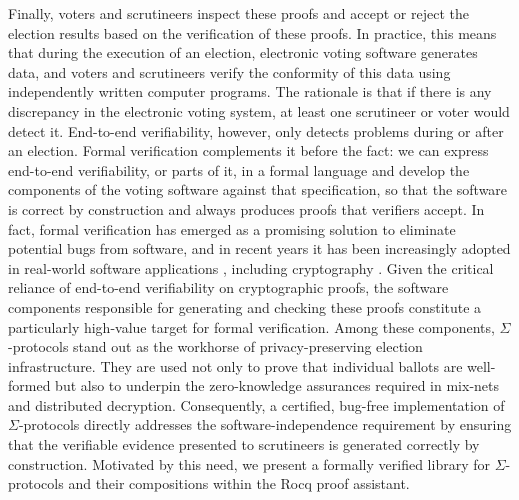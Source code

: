 \documentclass[sigconf,anonymous,review]{acmart}
\begin{document}
Finally, voters and scrutineers inspect these proofs and accept or reject the election results based on 
the verification of these proofs. In practice, this means that during the execution of an election, 
electronic voting software generates data, and voters and scrutineers verify the conformity of 
this data using independently written computer programs. The rationale is that if there is 
any discrepancy in the electronic voting system, at least one scrutineer or voter would detect it.
End-to-end verifiability, however, only detects problems during or after an election. Formal 
verification complements it before the fact: we can express end-to-end verifiability, or parts of it, 
in a formal language and develop the components of the voting software against that specification, 
so that the software is correct by construction and always produces proofs that verifiers accept.
In fact, formal verification has emerged as a promising solution 
to eliminate potential bugs from software, and in recent years it has been increasingly 
adopted in real-world software applications \cite{10.1145/1111037.1111042}, 
including cryptography \cite{8835346,10.1145/3133956.3134043,190894,10.1145/2701415,
10.1145/2660267.2660370,10.1145/3319535.3363211}. Given the critical reliance of end-to-end verifiability on cryptographic proofs, the software components responsible for generating and checking these proofs constitute a particularly high-value target for formal verification. Among these components, $\Sigma$-protocols stand out as the workhorse of privacy-preserving election infrastructure. 
They are used not only to prove that individual ballots are well-formed but also to underpin the zero-knowledge assurances required in mix-nets and distributed decryption. 
Consequently, a certified, bug-free implementation of $\Sigma$-protocols directly addresses the software-independence requirement by ensuring that the verifiable evidence presented to scrutineers is generated correctly by construction.  Motivated by this need, we present a formally verified library for $\Sigma$-protocols and their compositions within the Rocq proof assistant.
\end{document}
